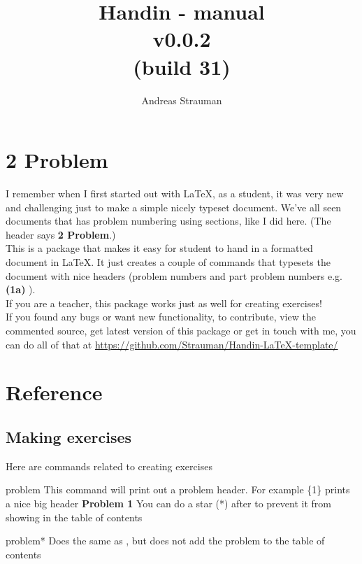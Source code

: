 \documentclass{article}
\title{{Handin - manual\\ v0.0.2{\\[-0.5em]\footnotesize(build 31)}}}
\author{Andreas Strauman}
\let\dac\docAuxCommand
\begin{document}
\maketitle
\section*{2 Problem}
I remember when I first started out with LaTeX, as a student, it was very new and challenging just to make a simple nicely typeset document. We've all seen documents that has problem numbering using sections, like I did here. (The header says \textbf{2 Problem}.)\\

This is a package that makes it easy for student to hand in a formatted document in LaTeX. It just creates a couple of commands that typesets the document with nice headers (problem numbers and part problem numbers e.g. \textbf{(1a)} ).\\

If you are a teacher, this package works just as well for creating exercises!\\
 
If you found any bugs or want new functionality, to contribute, view the commented source, get latest version of this package or get in touch with me, you can do all of that at \url{https://github.com/Strauman/Handin-LaTeX-template/}
\tableofcontents
\clearpage
 \section{Reference}
\subsection{Making exercises}
 Here are commands related to creating exercises


\begin{docCommand}[]{problem}{}
 This command will print out a problem header. For example \dac{problem}\{1\}
 prints a nice big header \textbf{Problem 1} You can do a star (*) after \dac{problem} to
 prevent it from showing in the table of contents

\end{docCommand}

\begin{docCommand}[]{problem*}{}
 Does the same as \dac{problem}, but does not add the problem to the table of contents

\end{docCommand}
\end{document}
